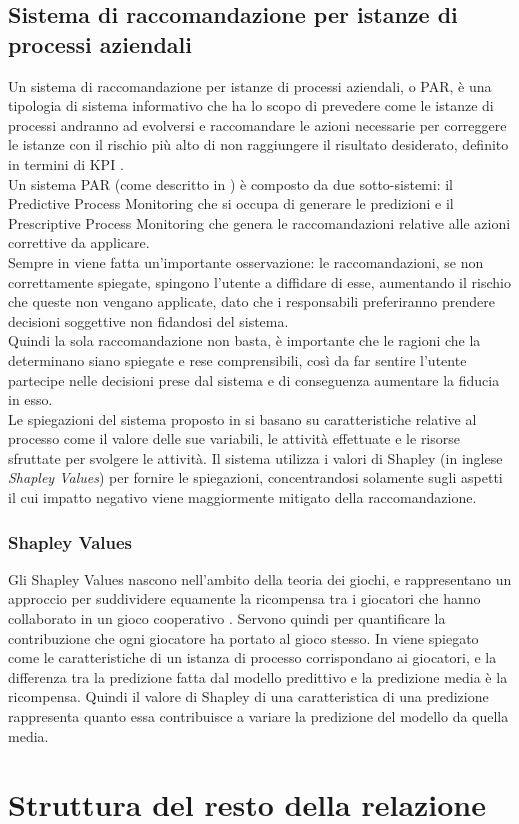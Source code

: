 \subsection{Sistema di raccomandazione per istanze di processi aziendali}
Un sistema di raccomandazione per istanze di processi aziendali, o PAR, è una tipologia di sistema informativo che ha lo scopo di prevedere come le istanze di processi andranno ad evolversi e raccomandare le azioni necessarie per correggere le istanze con il rischio più alto di non raggiungere il risultato desiderato, definito in termini di \gls{KPI} \cite{paper-padella}.
\\
Un sistema PAR (come descritto in \cite{paper-padella}) è composto da due sotto-sistemi: il Predictive Process Monitoring che si occupa di generare le predizioni e il Prescriptive Process Monitoring che genera le raccomandazioni relative alle azioni correttive da applicare.
\\
Sempre in \cite{paper-padella} viene fatta un'importante osservazione: le raccomandazioni, se non correttamente spiegate, spingono l'utente a diffidare di esse, aumentando il rischio che queste non vengano applicate, dato che i responsabili preferiranno prendere decisioni soggettive non fidandosi del sistema.
\\
Quindi la sola raccomandazione non basta, è importante che le ragioni che la determinano siano spiegate e rese comprensibili, così da far sentire l'utente partecipe nelle decisioni prese dal sistema e di conseguenza aumentare la fiducia in esso.
\\
Le spiegazioni del sistema proposto in \cite{paper-padella} si basano su caratteristiche relative al processo come il valore delle sue variabili, le attività effettuate e le risorse sfruttate per svolgere le attività. Il sistema utilizza i valori di Shapley (in inglese \textit{Shapley Values}) per fornire le spiegazioni, concentrandosi solamente sugli aspetti il cui impatto negativo viene maggiormente mitigato della raccomandazione.


\subsubsection{Shapley Values}
Gli Shapley Values nascono nell'ambito della teoria dei giochi, e rappresentano un approccio per suddividere equamente la ricompensa tra i giocatori che hanno collaborato in un gioco cooperativo \cite{site:wiki-shapley-values}. Servono quindi per quantificare la contribuzione che ogni giocatore ha portato al gioco stesso. In \cite{paper-padella} viene spiegato come le caratteristiche di un istanza di processo corrispondano ai giocatori, e la differenza tra la predizione fatta dal modello predittivo e la predizione media è la ricompensa. Quindi il valore di Shapley di una caratteristica di una predizione rappresenta quanto essa contribuisce a variare la predizione del modello da quella media.

\section{Struttura del resto della relazione}

